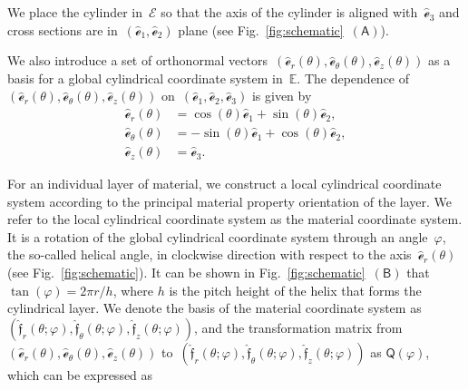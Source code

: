 \documentclass[preprint,10pt,times]{elsarticle}
\numberwithin{equation}{section}
\newcommand{\physe}{\hat{\mathscr{e}}} %
\newcommand{\physf}{\hat{\boldsymbol{\mathfrak{f}}}}
\renewcommand{\u}[1]{\boldsymbol{#1}}
\newcommand{\usf}[1]{\u{\mathsf #1}}
\newcommand{\pr}[1]{\left( #1 \right)}
\newcommand{\subf}[1]{\pr{\textsf{#1}}}
\renewcommand{\>}{$\Rightarrow$}
\begin{document}
We place the cylinder in~$\mathcal{E}$ so that the axis of the cylinder is aligned with~$\physe_3$ and cross sections are in~$(\physe_1,\physe_2)$ plane (see Fig.~\ref{fig:schematic}~$\subf{A}$).

We also introduce a set of orthonormal vectors~$(\physe_{r}(\theta),\physe_{\theta}(\theta),\physe_{z}(\theta))$ as a basis for a global cylindrical coordinate system in~$\mathbb{E}$. The dependence of~$(\physe_{r}(\theta),\physe_{\theta}(\theta),\physe_{z}(\theta))$ on~$(\physe_1,\physe_2,\physe_3)$ is given by
\begin{subequations}
\begin{align}
\physe_{r}(\theta) & = \cos(\theta) \physe_1 + \sin(\theta) \physe_2 , \\
\physe_{\theta}(\theta) & = -\sin(\theta) \physe_1 + \cos(\theta) \physe_2 , \\
\physe_{z} (\theta) & =  \physe_3.
\end{align}
\end{subequations}

For an individual layer of material, we construct a local cylindrical coordinate system according to the principal material property orientation of the layer. We refer to the local cylindrical coordinate system as the material coordinate system. It is a rotation of the global cylindrical coordinate system through an angle~$\varphi$, the so-called helical angle, in clockwise direction with respect to the axis~$\physe_{r}(\theta)$ (see Fig.~\ref{fig:schematic}).
It can be shown in Fig.~\ref{fig:schematic}~$\subf{B}$ that $\tan(\varphi) = 2 \pi r/h$, where $h$ is the pitch height of the helix that forms the cylindrical layer. We denote the basis of the material coordinate system as~$\pr{\physf_{r}(\theta;\varphi),\physf_{\theta}(\theta;\varphi),\physf_{z}(\theta;\varphi)}$,
and the transformation matrix from~$(\physe_{r}(\theta),\physe_{\theta}(\theta),\physe_{z}(\theta))$ to~$\pr{\physf_{r}(\theta;\varphi),\physf_{\theta}(\theta;\varphi),\physf_{z}(\theta;\varphi)}$ as $\usf{Q}(\varphi)$, which can be expressed as
\end{document}
